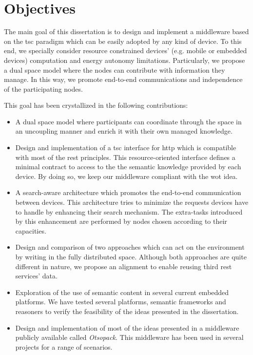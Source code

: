 \section{Objectives}

The main goal of this dissertation is to design and implement a middleware based on the \ac{tsc} paradigm which can be easily adopted by any kind of device.
To this end, we specially consider resource constrained devices' (e.g. mobile or embedded devices) computation and energy autonomy limitations.
Particularly, we propose a dual space model where the nodes can contribute with information they manage. %
In this way, we promote end-to-end communications and independence of the participating nodes.


This goal has been crystallized in the following contributions:

\begin{itemize} %
  \item A dual space model where participants can coordinate through the space in an uncoupling manner and enrich it with their own managed knowledge.
  \item Design and implementation of a \ac{tsc} interface for \ac{http} which is compatible with most of the \ac{rest} principles.
	This resource-oriented interface defines a minimal contract to access to the the semantic knowledge provided by each device.
	By doing so, we keep our middleware compliant with the \ac{wot} idea. %
  \item A search-aware architecture which promotes the end-to-end communication between devices. %
	This architecture tries to minimize the requests devices have to handle by enhancing their search mechanism.
	The extra-tasks introduced by this enhancement are performed by nodes chosen according to their capacities.
  \item Design and comparison of two approaches which can act on the environment by writing in the fully distributed space.
	Although both approaches are quite different in nature, we propose an alignment to enable reusing third \ac{rest} services' data.
  \item Exploration of the use of semantic content in several current embedded platforms.
	We have tested several platforms, semantic frameworks and reasoners to verify the feasibility of the ideas presented in the dissertation.
  \item Design and implementation of most of the ideas presented in a middleware publicly available called \emph{Otsopack}. %
	This middleware has been used in several projects for a range of scenarios.
\end{itemize}